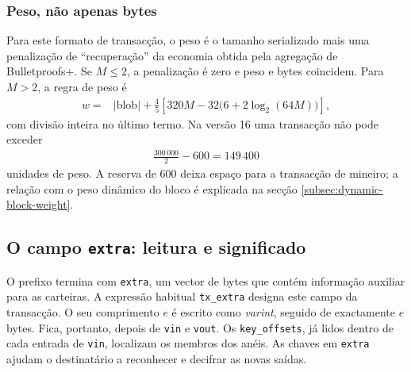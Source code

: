\subsubsection*{Peso, não apenas bytes}

%
Para este formato de transacção, o peso é o tamanho serializado mais uma
penalização de ``recuperação'' da economia obtida pela agregação de
Bulletproofs+. Se \(M\leq2\), a penalização é zero e peso e bytes coincidem.
Para \(M>2\), a regra de peso é
\begin{align*}
 w={}&|\mathrm{blob}|+
 \frac{4}{5}\left[
 320M-32\bigl(6+2\log_2(64M)\bigr)
 \right],
\end{align*}
com divisão inteira no último termo. Na versão 16 uma transacção não pode
exceder
\begin{align*}
 \frac{300\,000}{2}-600=149\,400
\end{align*}
unidades de peso. A reserva de 600 deixa espaço para a transacção de mineiro;
a relação com o peso dinâmico do bloco é explicada na secção
\ref{subsec:dynamic-block-weight}.



\subsection{O campo \texttt{extra}: leitura e significado}
\label{subsec:tx-extra-structure}

O prefixo termina com \texttt{extra}, um vector de bytes que contém
informação auxiliar para as carteiras. A expressão habitual
\texttt{tx\_extra} designa este campo da transacção. O seu comprimento
\(e\) é escrito como \emph{varint}, seguido de exactamente \(e\) bytes.
Fica, portanto, depois de \texttt{vin} e \texttt{vout}. Os
\texttt{key\_offsets}, já lidos dentro de cada entrada de \texttt{vin},
localizam os membros dos anéis. As chaves em \texttt{extra} ajudam o
destinatário a reconhecer e decifrar as novas saídas.

